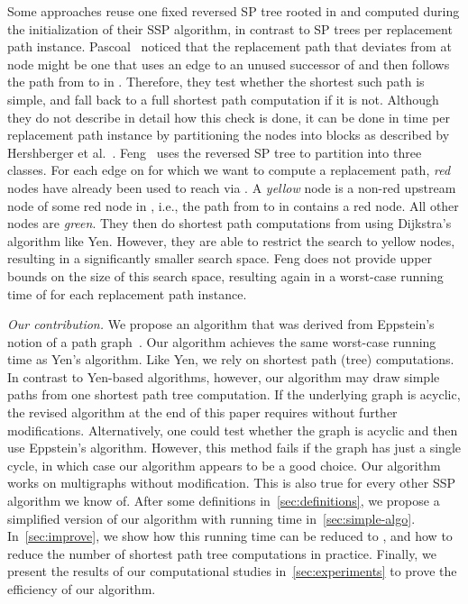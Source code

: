 \documentclass[runningheads,a4paper]{llncs}
\begin{document}
Some approaches reuse one fixed reversed SP tree  rooted in  and computed during the initialization of their SSP algorithm, in contrast to  SP trees per replacement path instance.
Pascoal~\cite{Pascoal06implementationsand} noticed that the replacement path that deviates from  at node  might be one that uses an edge  to an unused successor  of  and then follows the path from  to  in .
Therefore, they test whether the shortest such path is simple, and fall back to a full shortest path computation if it is not.
Although they do not describe in detail how this check is done, it can be done in time  per replacement path instance by partitioning the nodes into blocks as described by Hershberger et al.~\cite{DBLP:journals/talg/HershbergerMS07}.
Feng~\cite{DBLP:journals/networks/Feng14} uses the reversed SP tree to partition  into three classes.
For each edge  on  for which we want to compute a replacement path, \emph{red} nodes have already been used to reach  via .
A \emph{yellow} node  is a non-red upstream node of some red node in , i.e., the path from  to  in  contains a red node.
All other nodes are \emph{green}.
They then do shortest path computations from  using Dijkstra's algorithm like Yen.
However, they are able to restrict the search to yellow nodes, resulting in a significantly smaller search space.
Feng does not provide upper bounds on the size of this search space, resulting again in a worst-case running time of  for each replacement path instance.

\emph{Our contribution.}
We propose an algorithm that was derived from Eppstein's notion of a path graph~\cite{DBLP:journals/siamcomp/Eppstein98}.
Our algorithm achieves the same worst-case running time as Yen's algorithm.
Like Yen, we rely on shortest path (tree) computations.
In contrast to Yen-based algorithms, however, our algorithm may draw  simple paths from one shortest path tree computation.
If the underlying graph is acyclic, the revised algorithm at the end of this paper requires  without further modifications.
Alternatively, one could test whether the graph is acyclic and then use Eppstein's algorithm.
However, this method fails if the graph has just a single cycle, in which case our algorithm appears to be a good choice.
Our algorithm works on multigraphs without modification.
This is also true for every other SSP algorithm we know of.
After some definitions in~\autoref{sec:definitions}, we propose a simplified version of our algorithm with running time  in~\autoref{sec:simple-algo}.
In~\autoref{sec:improve}, we show how this running time can be reduced to , and how to reduce the number of shortest path tree computations in practice.
Finally, we present the results of our computational studies in~\autoref{sec:experiments} to prove the efficiency of our algorithm.
\end{document}
